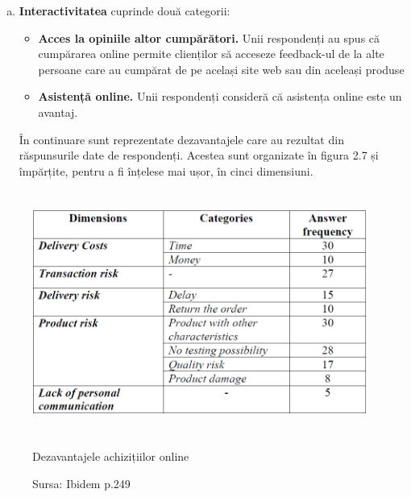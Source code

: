 \documentclass[a4paper, 12pt]{article}
\begin{document}
\begin{enumerate}[a.]
\begin{itemize}
	\end{itemize}
	\item\textbf{Interactivitatea} cuprinde două categorii:
	\begin{itemize}
		\item\textbf {Acces la opiniile altor cumpărători.} Unii respondenți au spus că cumpărarea online permite clienților să acceseze feedback-ul de la alte persoane care au cumpărat de pe același site web sau din aceleași produse
		\item\textbf{Asistență online.} Unii respondenți consideră că asistența online este un avantaj.
	\end{itemize}
	\quad În continuare sunt reprezentate dezavantajele care au rezultat din răspunsurile date de respondenți. Acestea sunt organizate în figura 2.7 și împărțite, pentru a fi înțelese mai ușor, în cinci dimensiuni.
	\end{enumerate}
		\begin{figure}[!htb]
		\centering
		\includegraphics[width=11cm, height=8cm]{"figures/noua.png"}
		\caption{Dezavantajele achizițiilor online}\label{fig:zece}
		\caption*{Sursa: Ibidem p.249}
	\end{figure}
\end{document}
